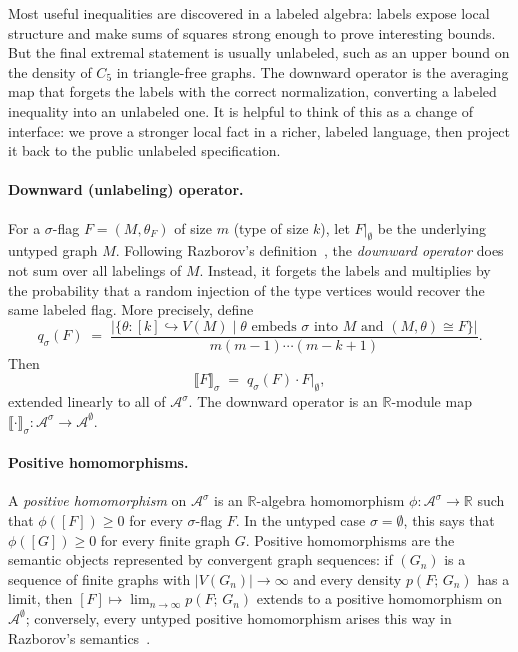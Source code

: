 \documentclass{article}
\newcommand{\den}[2]{p(#1;\,#2)}
\begin{document}
Most useful inequalities are discovered in a labeled algebra: labels expose
local structure and make sums of squares strong enough to prove interesting
bounds.  But the final extremal statement is usually unlabeled, such as an
upper bound on the density of $C_5$ in triangle-free graphs.  The downward
operator is the averaging map that forgets the labels with the correct
normalization, converting a labeled inequality into an unlabeled one.  It is
helpful to think of this as a change of interface: we prove a stronger local
fact in a richer, labeled language, then project it back to the public
unlabeled specification.

\paragraph{Downward (unlabeling) operator.}
For a $\sigma$-flag $F=(M,\theta_F)$ of size $m$ (type of size $k$), let
$F|_\emptyset$ be the underlying untyped graph $M$.  Following Razborov's
definition~\cite{razborov2007flag}, the \emph{downward operator} does not sum
over all labelings of $M$.  Instead, it forgets the labels and multiplies by
the probability that a random injection of the type vertices would recover the
same labeled flag.  More precisely, define
\[
  q_\sigma(F)
  \;=\;
  \frac{
    \bigl|\{\theta : [k]\hookrightarrow V(M)
       \mid \theta \text{ embeds }\sigma\text{ into }M
       \text{ and } (M,\theta)\cong F\}\bigr|}
       {m(m-1)\cdots(m-k+1)}.
\]
Then
\[
  \llbracket F \rrbracket_\sigma
  \;=\;
  q_\sigma(F)\cdot F|_\emptyset,
\]
extended linearly to all of $\mathcal{A}^\sigma$.
The downward operator is an $\mathbb{R}$-module map
$\llbracket\cdot\rrbracket_\sigma : \mathcal{A}^\sigma \to \mathcal{A}^\emptyset$.

\paragraph{Positive homomorphisms.}
A \emph{positive homomorphism} on $\mathcal{A}^\sigma$ is an
$\mathbb{R}$-algebra homomorphism
$\phi:\mathcal{A}^\sigma \to \mathbb{R}$ such that
$\phi([F]) \geq 0$ for every $\sigma$-flag $F$.  In the untyped case
$\sigma=\emptyset$, this says that $\phi([G]) \geq 0$ for every finite graph
$G$.
Positive homomorphisms are the semantic objects represented by convergent graph
sequences: if $(G_n)$ is a sequence of finite graphs with $|V(G_n)|\to\infty$
and every density $\den{F}{G_n}$ has a limit, then
$[F]\mapsto \lim_{n\to\infty}\den{F}{G_n}$ extends to a positive homomorphism
on $\mathcal{A}^\emptyset$; conversely, every untyped positive homomorphism
arises this way in Razborov's semantics~\cite{razborov2007flag}.
\end{document}
